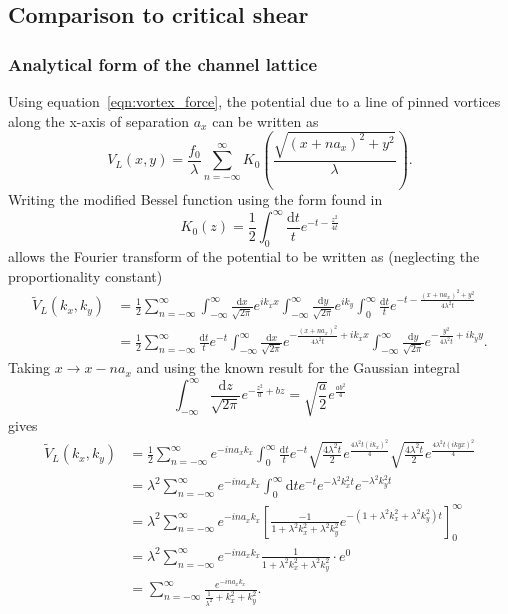 \documentclass{article}
\numberwithin{equation}{section}
\begin{document}
\subsection{Comparison to critical shear} \label{sec:comp_crit_chear}
\subsubsection{Analytical form of the channel lattice} \label{sec:analytic_chan}
Using equation~\ref{eqn:vortex_force}, the potential due to a line of pinned vortices along the x-axis of separation $a_x$ can be written as \cite{Watkins2016DensitySuperconductors}
\begin{equation}
    V_L(x, y) = \frac{f_0}{\lambda}\sum_{n=-\infty}^\infty K_0 \left( \frac{\sqrt{(x + na_x)^2 + y^2}}{\lambda} \right).
\end{equation}
Writing the modified Bessel function using the form found in \cite{I.S.Gradshteyn2015TableProducts}
\begin{equation}
    K_0(z) = \frac{1}{2}\int_0^\infty \frac{\mathrm{d}t}{t}e^{-t-\frac{z^2}{4t}}
\end{equation}
allows the Fourier transform of the potential to be written as (neglecting the proportionality constant)
\begin{align*}
    \tilde{V}_L(k_x, k_y) &= \frac{1}{2}\sum_{n=-\infty}^\infty \int_{-\infty}^\infty\frac{\mathrm{d}x}{\sqrt{2\pi}}e^{ik_xx} \int_{-\infty}^\infty\frac{\mathrm{d}y}{\sqrt{2\pi}}e^{ik_y} \int_0^\infty\frac{\mathrm{d}t}{t}e^{-t-\frac{(x+na_x)^2 + y^2}{4\lambda^2t}} \\
    &= \frac{1}{2}\sum_{n=-\infty}^\infty \frac{\mathrm{d}t}{t}e^{-t} \int_{-\infty}^\infty\frac{\mathrm{d}x}{\sqrt{2\pi}}e^{-\frac{(x+na_x)^2}{4\lambda^2t}+ik_xx}
    \int_{-\infty}^\infty\frac{\mathrm{d}y}{\sqrt{2\pi}}e^{-\frac{y^2}{4\lambda^2t}+ik_yy}.
\end{align*}
Taking $x \rightarrow x - na_x$ and using the known result for the Gaussian integral
\begin{equation}
    \int_{-\infty}^\infty\frac{\mathrm{d}z}{\sqrt{2\pi}}e^{-\frac{z^2}{a}+bz} = \sqrt{\frac{a}{2}}e^{\frac{ab^2}{4}}
\end{equation}
gives
\begin{align*}
    \tilde{V}_L(k_x, k_y) &= \frac{1}{2}\sum_{n=-\infty}^\infty e^{-ina_xk_x} \int_0^\infty\frac{\mathrm{d}t}{t}e^{-t} \sqrt{\frac{4\lambda^2t}{2}}e^{\frac{4\lambda^2t(ik_x)^2}{4}} \sqrt{\frac{4\lambda^2t}{2}}e^{\frac{4\lambda^2t(ikyx)^2}{4}} \\
    &= \lambda^2\sum_{n=-\infty}^\infty e^{-ina_xk_x} \int_0^\infty\mathrm{d}te^{-t}e^{-\lambda^2k_x^2t}e^{-\lambda^2k_y^2t} \\
    &= \lambda^2\sum_{n=-\infty}^\infty e^{-ina_xk_x} \left[\frac{-1}{1+\lambda^2k_x^2+\lambda^2k_y^2} e^{-\left(1+\lambda^2k_x^2+\lambda^2k_y^2\right)t}\right]_0^\infty\ \\
    &= \lambda^2\sum_{n=-\infty}^\infty e^{-ina_xk_x} \frac{1}{1+\lambda^2k_x^2+\lambda^2k_y^2} \cdot e^0 \\
    &= \sum_{n=-\infty}^\infty \frac{e^{-ina_xk_x}}{\frac{1}{\lambda^2}+k_x^2+k_y^2}.
\end{align*}
\end{document}
